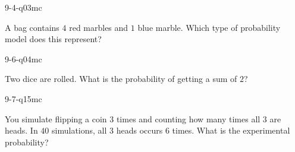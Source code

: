 \begin{practiceQuestion}{9-4-q03}{mc}
\begin{questionText}
A bag contains $4$ red marbles and $1$ blue marble. Which type of probability model does this represent?
\end{questionText}
\end{practiceQuestion}

\begin{practiceQuestion}{9-6-q04}{mc}
\begin{questionText}
Two dice are rolled. What is the probability of getting a sum of $2$?
\end{questionText}
\end{practiceQuestion}

\begin{practiceQuestion}{9-7-q15}{mc}
\begin{questionText}
You simulate flipping a coin $3$ times and counting how many times all $3$ are heads. In $40$ simulations, all $3$ heads occurs $6$ times. What is the experimental probability?
\end{questionText}
\end{practiceQuestion}
